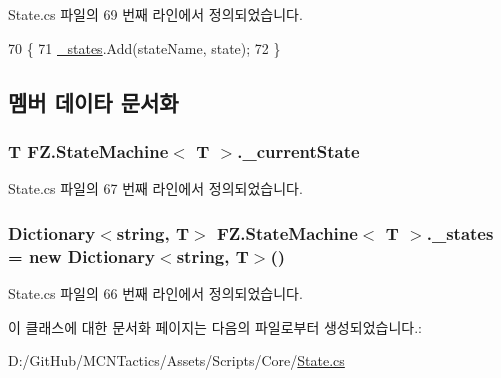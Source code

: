 State.\+cs 파일의 69 번째 라인에서 정의되었습니다.


\begin{DoxyCode}
70         \{
71             \hyperlink{class_f_z_1_1_state_machine_a9b898e40ec3b434b5a60ef1e4d51cc80}{\_states}.Add(stateName, state);
72         \}
\end{DoxyCode}


\subsection{멤버 데이타 문서화}
\subsubsection[{\texorpdfstring{\+\_\+current\+State}{_currentState}}]{\setlength{\rightskip}{0pt plus 5cm}T {\bf F\+Z.\+State\+Machine}$<$ T $>$.\+\_\+current\+State\hspace{0.3cm}{\ttfamily [private]}}\hypertarget{class_f_z_1_1_state_machine_a71de6122cd9b9d84048f679b1bb47c9f}{}\label{class_f_z_1_1_state_machine_a71de6122cd9b9d84048f679b1bb47c9f}


State.\+cs 파일의 67 번째 라인에서 정의되었습니다.

\subsubsection[{\texorpdfstring{\+\_\+states}{_states}}]{\setlength{\rightskip}{0pt plus 5cm}Dictionary$<$string, T$>$ {\bf F\+Z.\+State\+Machine}$<$ T $>$.\+\_\+states = new Dictionary$<$string, T$>$()\hspace{0.3cm}{\ttfamily [private]}}\hypertarget{class_f_z_1_1_state_machine_a9b898e40ec3b434b5a60ef1e4d51cc80}{}\label{class_f_z_1_1_state_machine_a9b898e40ec3b434b5a60ef1e4d51cc80}


State.\+cs 파일의 66 번째 라인에서 정의되었습니다.



이 클래스에 대한 문서화 페이지는 다음의 파일로부터 생성되었습니다.\+:\begin{DoxyCompactItemize}
\item 
D\+:/\+Git\+Hub/\+M\+C\+N\+Tactics/\+Assets/\+Scripts/\+Core/\hyperlink{_state_8cs}{State.\+cs}\end{DoxyCompactItemize}
